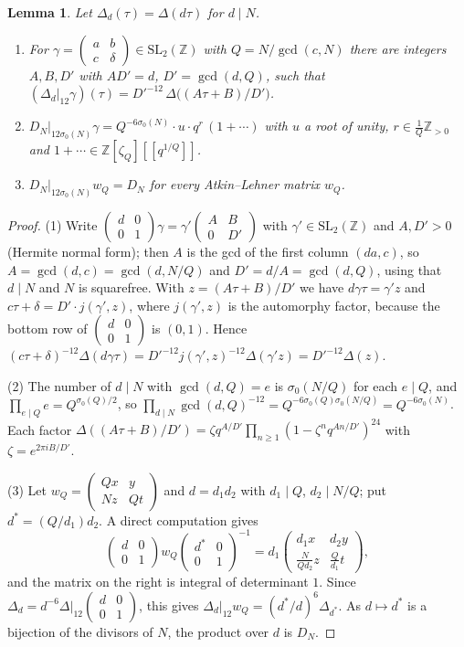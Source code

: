 \documentclass[11pt]{amsart}
\newtheorem{lemma}[theorem]{Lemma}
\theoremstyle{definition}
\theoremstyle{remark}
\newcommand{\Z}{\mathbb{Z}}
\newcommand{\SL}{\mathrm{SL}}
\newcommand{\sz}{\sigma_0}
\newcommand{\smat}[4]{\left(\begin{smallmatrix}#1&#2\\#3&#4\end{smallmatrix}\right)}
\begin{document}
\begin{lemma}\label{lem:delta}
Let $\Delta_d(\tau)=\Delta(d\tau)$ for $d\mid N$.
\begin{enumerate}
\item For $\gamma=\smat ab{c}{\delta}\in\SL_2(\Z)$ with $Q=N/\gcd(c,N)$ there are integers
$A,B,D'$ with $AD'=d$, $D'=\gcd(d,Q)$, such that
$(\Delta_d|_{12}\gamma)(\tau)=D'^{-12}\,\Delta\bigl((A\tau+B)/D'\bigr)$.
\item $D_N|_{12\sz(N)}\gamma=Q^{-6\sz(N)}\cdot u\cdot q^{r}\,(1+\cdots)$ with $u$
a root of unity, $r\in\frac1Q\Z_{>0}$ and $1+\cdots\in\Z[\zeta_Q][[q^{1/Q}]]$.
\item $D_N|_{12\sz(N)}w_Q=D_N$ for every Atkin--Lehner matrix $w_Q$.
\end{enumerate}
\end{lemma}
\begin{proof}
(1) Write $\smat d001\gamma=\gamma'\smat AB0{D'}$ with $\gamma'\in\SL_2(\Z)$ and
$A,D'>0$ (Hermite normal form); then $A$ is the gcd of the first column
$(da,c)$, so $A=\gcd(d,c)=\gcd(d,N/Q)$ and $D'=d/A=\gcd(d,Q)$, using that $d\mid N$
and $N$ is squarefree.  With $z=(A\tau+B)/D'$ we have $d\gamma\tau=\gamma'z$ and
$c\tau+\delta=D'\cdot j(\gamma',z)$, where $j(\gamma',z)$ is the automorphy factor,
because the bottom row of $\smat d001$ is $(0,1)$.  Hence
$(c\tau+\delta)^{-12}\Delta(d\gamma\tau)=D'^{-12}j(\gamma',z)^{-12}\Delta(\gamma'z)=D'^{-12}\Delta(z)$.

(2) The number of $d\mid N$ with $\gcd(d,Q)=e$ is $\sz(N/Q)$ for each $e\mid Q$,
and $\prod_{e\mid Q}e=Q^{\sz(Q)/2}$, so
$\prod_{d\mid N}\gcd(d,Q)^{-12}=Q^{-6\sz(Q)\sz(N/Q)}=Q^{-6\sz(N)}$.  Each factor
$\Delta((A\tau+B)/D')=\zeta q^{A/D'}\prod_{n\ge1}(1-\zeta^nq^{An/D'})^{24}$ with
$\zeta=e^{2\pi iB/D'}$.

(3) Let $w_Q=\smat{Qx}{y}{Nz}{Qt}$ and $d=d_1d_2$ with $d_1\mid Q$,
$d_2\mid N/Q$; put $d^*=(Q/d_1)d_2$.  A direct computation gives
\[
\smat d001w_Q\smat{d^*}001^{-1}
=d_1\begin{pmatrix}d_1x&d_2y\\ \frac{N}{Qd_2}z&\frac{Q}{d_1}t\end{pmatrix},
\]
and the matrix on the right is integral of determinant $1$.  Since
$\Delta_d=d^{-6}\Delta|_{12}\smat d001$, this gives
$\Delta_d|_{12}w_Q=(d^*/d)^{6}\Delta_{d^*}$.  As $d\mapsto d^*$ is a bijection of
the divisors of $N$, the product over $d$ is $D_N$.
\end{proof}
\end{document}
